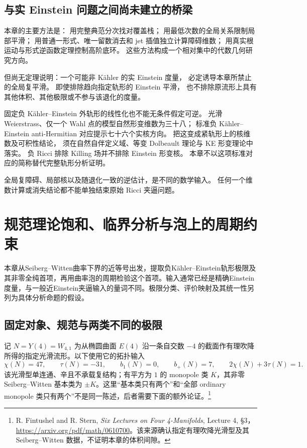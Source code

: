 \documentclass[UTF8,fontset=fandol,zihao=-4,oneside,openany]{ctexbook}
\theoremstyle{cjkplain}
\numberwithin{equation}{chapter}
\begin{document}
\section{与实 Einstein 问题之间尚未建立的桥梁}

本章的主要方法是：
用完整典范分次找对覆盖栈；
用最低次数的全局关系限制局部平滑；
用普通一形式、唯一留数消去和 jet 插值独立计算障碍维数；
用真实根运动与形式逆函数定理控制高阶底环。
这些方法构成一个相对集中的代数几何研究方向。

但尚无定理说明：一个可能非 Kähler 的实 Einstein 度量，
必定诱导本章所禁止的全局复平滑。
即使排除趋向指定轨形的 Einstein 平滑，
也不排除原流形上具有其他体积、其他极限或不参与该退化的度量。

固定负 Kähler--Einstein 外轨形的线性化也不能无条件假定可逆。
光滑 Weierstrass、仅一个 Wahl 点的模型自然形变维数为三十八；
标准负 Kähler--Einstein anti-Hermitian 对应提示七十六个实核方向。
把这变成紧轨形上的核维数及可积性结论，
须在自然自伴定义域、等变 Dolbeault 理论与 KE 形变理论中落实。
负 Ricci 排除 Killing 场并不排除 Einstein 形变核。
本章不以这项标准对应的简称替代完整轨形分析证明。

全局复障碍、局部核以及随退化一致的逆估计，是不同的数学输入。
任何一个维数计算或消失结论都不能单独结束原始 Ricci 夹逼问题。


\chapter{规范理论饱和、临界分析与泡上的周期约束}
\label{GAU:chapter}

本章从Seiberg--Witten曲率下界的近等号出发，提取负Kähler--Einstein轨形极限及其非零全纯首项，再用曲率泡的周期检验这个首项。输入通常已经是精确Einstein度量，与一般近Einstein夹逼输入的量词不同。极限分类、评价映射及其统一性另列为具体分析命题的假设。

\section{固定对象、规范与两类不同的极限}
\label{GAU:setup}

记 $N=Y(4)=W_{4,1}$ 为从椭圆曲面 $E(4)$ 沿一条自交数 $-4$ 的截面作有理吹降所得的指定光滑流形。以下使用它的拓扑输入
\begin{equation}\label{GAU:topology}
\chi(N)=47,\qquad \tau(N)=-31,\qquad b_1(N)=0,\qquad
b_+(N)=7,\qquad 2\chi(N)+3\tau(N)=1.
\end{equation}
该光滑型单连通、辛且不承载复结构；有平方为 $1$ 的 monopole 类 $K$，其非零 Seiberg--Witten 基本类为 $\pm K$。这里“基本类只有两个”和“全部 ordinary monopole 类只有两个”不是同一陈述，后者需要下面的额外论证。\footnote{R. Fintushel and R. Stern, \emph{Six Lectures on Four 4-Manifolds}, Lecture 4, §3，\url{https://arxiv.org/pdf/math/0610700}。该来源确认指定有理吹降光滑型及其 Seiberg--Witten 数据，不证明本章的体积间隙。}
\end{document}
